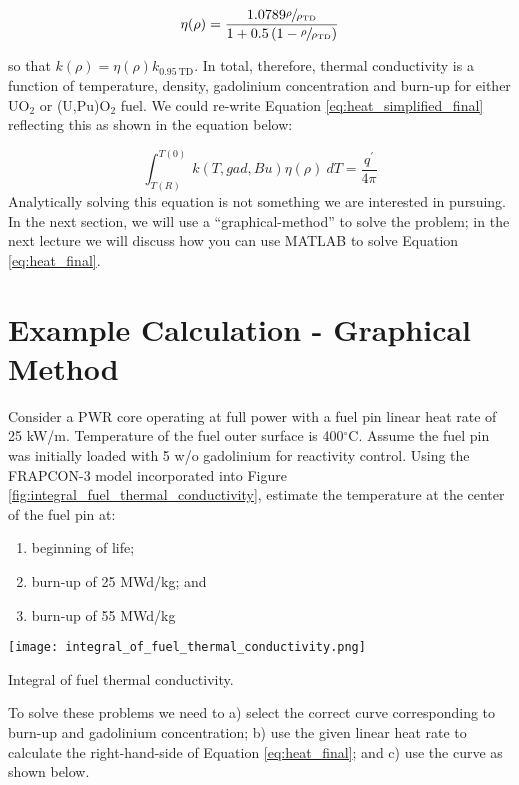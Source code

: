 \begin{equation}
\eta(\rho) = \frac{1.0789 \sfrac{\rho}{\rho_{\text{TD}}}}{1 + 0.5\left(1 - \sfrac{\rho}{\rho_{\text{TD}}} \right)} 
\label{eq:FRAP_density}
\end{equation}

so that $k(\rho) = \eta(\rho)k_{0.95 \ \text{TD}}$. In total, therefore, thermal conductivity is a function of temperature, density, gadolinium concentration and burn-up for either UO$_2$ or (U,Pu)O$_2$ fuel.  We could re-write Equation \ref{eq:heat_simplified_final} reflecting this as shown in the equation below:

\begin{equation}
\int_{T(R)}^{T(0)} k(T,gad,Bu)\eta(\rho) \ dT = \frac{q^{\prime}}{4 \pi}
\label{eq:heat_final}
\end{equation}
Analytically solving this equation is not something we are interested in pursuing. In the next section, we will use a ``graphical-method'' to solve the problem; in the next lecture we will discuss how you can use MATLAB to solve Equation \ref{eq:heat_final}.

\section{Example Calculation - Graphical Method}

Consider a PWR core operating at full power with a fuel pin linear heat rate of 25 kW/m.  Temperature of the fuel outer surface is 400$^{\circ}$C. Assume the fuel pin was initially loaded with 5 w/o gadolinium for reactivity control.  Using the FRAPCON-3 model incorporated into Figure \ref{fig:integral_fuel_thermal_conductivity}, estimate the temperature at the center of the fuel pin at:
\begin{enumerate}
\item beginning of life;
\item burn-up of 25 MWd/kg; and
\item burn-up of 55 MWd/kg
\end{enumerate}

\begin{marginfigure}
\texttt{[image: integral\_of\_fuel\_thermal\_conductivity.png]}
\caption{Integral of fuel thermal conductivity.}
\label{fig:integral_fuel_thermal_conductivity}
\end{marginfigure}

To solve these problems we need to a) select the correct curve corresponding to burn-up and gadolinium concentration; b) use the given linear heat rate to calculate the right-hand-side of Equation \ref{eq:heat_final}; and c) use the curve as shown below.

